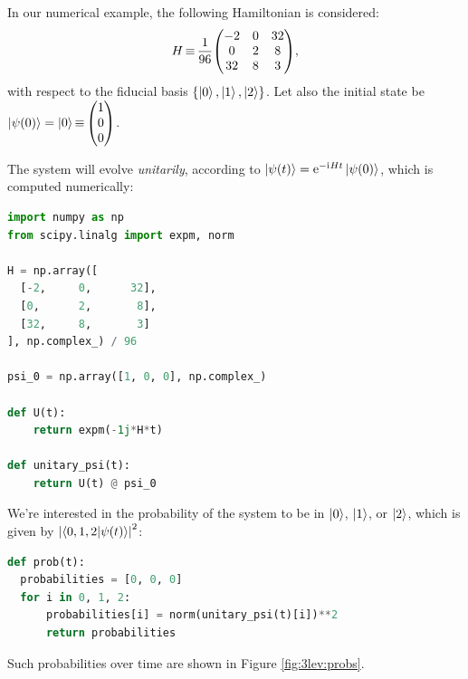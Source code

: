 In our numerical example, the following
Hamiltonian is considered:
\begin{equation}\label{eq:3lev:H}
  H \repr \frac{1}{96} \mqty(
    -2  & 0 & 32  \\
     0  & 2 & 8   \\
    32  & 8 & 3
  )
  \text{,}
\end{equation}
with respect to the fiducial basis $\qty{\ket{0}, \ket{1}, \ket{2}}$.
Let also
the initial state be $\ket{\psi(0)} = \ket{0} \repr \mqty(1 \\ 0 \\ 0)$.

The system will evolve \emph{unitarily}, according to $\ket{\psi(t)} = \mathrm{e}^{-\mathrm{i}\mkern1mu H t} \ket{\psi(0)}$,
which is computed numerically:
\begin{lstlisting}[language=Python]
import numpy as np
from scipy.linalg import expm, norm

H = np.array([
  [-2,     0,      32],
  [0,      2,       8],
  [32,     8,       3]
], np.complex_) / 96

psi_0 = np.array([1, 0, 0], np.complex_)

def U(t):
    return expm(-1j*H*t)

def unitary_psi(t):
    return U(t) @ psi_0
\end{lstlisting}

We're interested in the probability of the system to be in $\ket{0}$, $\ket{1}$, or $\ket{2}$,
which is given by $\abs{\braket{0, 1, 2}{\psi(t)}}^2$:
\begin{lstlisting}[language=Python]
def prob(t):
  probabilities = [0, 0, 0]
  for i in 0, 1, 2:
      probabilities[i] = norm(unitary_psi(t)[i])**2
      return probabilities
\end{lstlisting}
Such probabilities over time are shown in Figure \ref{fig:3lev:probs}. 

